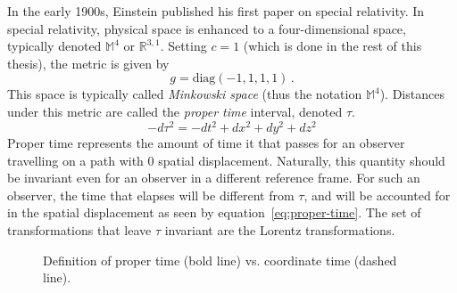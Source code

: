 In the early 1900s, Einstein published his first paper on special relativity. In special relativity, physical space is enhanced to a four-dimensional space, typically denoted $\mathbb{M}^4$ or $\mathbb{R}^{3,1}$. Setting $c=1$ (which is done in the rest of this thesis), the metric is given by
\begin{equation}
    g = \mathrm{diag}(-1,1,1,1)\,.
\end{equation}
This space is typically called \textit{Minkowski space} (thus the notation $\mathbb{M}^4$). Distances under this metric are called the \textit{proper time} interval, denoted $\tau$.
\begin{equation}\label{eq:proper-time}
    -d\tau^2 = -dt^2 + dx^2 + dy^2 + dz^2
\end{equation}
Proper time represents the amount of time it that passes for an observer travelling on a path with 0 spatial displacement. Naturally, this quantity should be invariant even for an observer in a different reference frame. For such an observer, the time that elapses will be different from $\tau$, and will be accounted for in the spatial displacement as seen by equation~\ref{eq:proper-time}. The set of transformations that leave $\tau$ invariant are the Lorentz transformations.
\begin{figure}
    \centering
    \caption{Definition of proper time (bold line) vs. coordinate time (dashed line).}
\end{figure}

